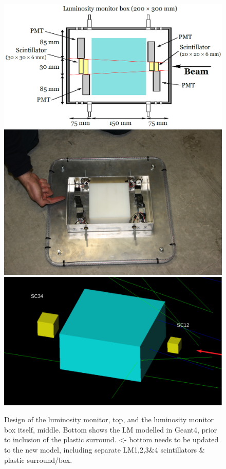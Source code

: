 \documentclass[a4paper,11pt]{article}
\begin{document}
\begin{figure}
  \centering
    \includegraphics[width=0.8\columnwidth]{./figures/LM2.png}
    \includegraphics[width=0.8\columnwidth]{./figures/LM3.jpg}
    \includegraphics[width=0.8\columnwidth]{./figures/LM5.pdf}
  \caption{Design of the luminosity monitor, top, and the luminosity monitor box itself, middle. Bottom shows the LM modelled in Geant4, prior to inclusion of the plastic surround. <- bottom needs to be updated to the new model, including separate LM1,2,3\&4 scintillators \& plastic surround/box. }
  \label{fig:LM3}
\end{figure}
\end{document}
